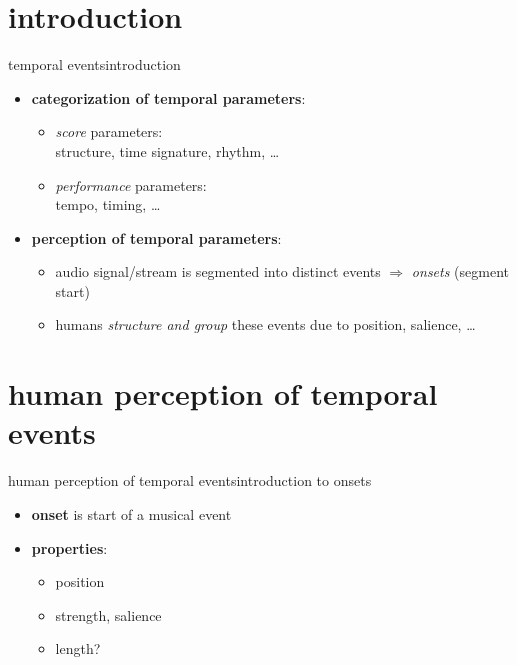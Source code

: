     \section[intro]{introduction}
        \begin{frame}{temporal events}{introduction}
            \begin{itemize}
                \item  \textbf{categorization of temporal parameters}:
                    \begin{itemize}
                        \item	\textit{score} parameters:\\ structure, time signature, rhythm, \ldots
                        \item	\textit{performance} parameters:\\ tempo, timing, \ldots
                    \end{itemize}
                \bigskip
                \item<2->   \textbf{perception of temporal parameters}:
                    \begin{itemize}
                        \item	audio signal/stream is segmented into distinct events $\Rightarrow$ \textit{onsets} (segment start)
                        \item	humans \textit{structure and group} these events due to position, salience, \ldots
                    \end{itemize}
            \end{itemize}
        \end{frame}

    \section[perception]{human perception of temporal events}
        \begin{frame}{human perception of temporal events}{introduction to onsets}
            \vspace{-3mm}
            \begin{itemize}
                \item   \textbf{onset} is start of a musical event
                \smallskip
                \item<1->   \textbf{properties}:
                    \begin{itemize}
                        \item<1->	position
                        \item<1->	strength, salience
                        \item<1->	length?
                    \end{itemize}
            \end{itemize}
                \vspace{-3mm}
                {}
        \end{frame}

